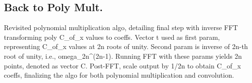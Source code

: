 \subsection*{Back to Poly Mult.}
Revisited polynomial multiplication algo, detailing final step with inverse FFT transforming poly C\_of\_x values to coeffs.
Vector t used as first param, representing C\_of\_x values at 2n roots of unity.
Second param is inverse of 2n-th root of unity, i.e., omega\_2n\textasciicircum{}(2n-1).
Running FFT with these params yields 2n points, denoted as vector C\@.
Post-FFT, scale output by 1/2n to obtain C\_of\_x coeffs, finalizing the algo for both polynomial multiplication and convolution.

